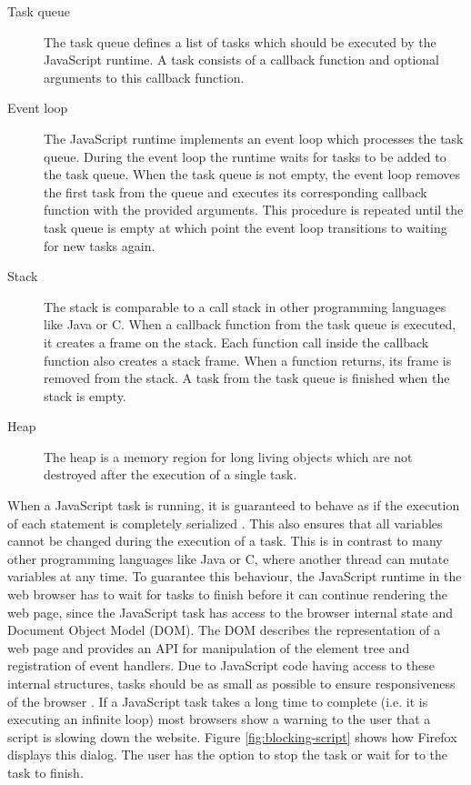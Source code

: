 \documentclass[
	ruledheaders=section,%
	class=report,%
	thesis={type=bachelor},%
	accentcolor=9c,%
	custommargins=true,%
	marginpar=false,%
	parskip=half-,%
	fontsize=11pt,%
]{tudapub}
\begin{document}
  \begin{description}
  \item[Task queue] The task queue defines a list of tasks which should be executed by the JavaScript runtime. A task consists of a callback function and optional arguments to this callback function.
  \item[Event loop] The JavaScript runtime implements an event loop which processes the task queue. During the event loop the runtime waits for tasks to be added to the task queue. When the task queue is not empty, the event loop removes the first task from the queue and executes its corresponding callback function with the provided arguments. This procedure is repeated until the task queue is empty at which point the event loop transitions to waiting for new tasks again.
  \item[Stack] The stack is comparable to a call stack in other programming languages like Java or C. When a callback function from the task queue is executed, it creates a frame on the stack. Each function call inside the callback function also creates a stack frame. When a function returns, its frame is removed from the stack. A task from the task queue is finished when the stack is empty.
  \item[Heap] The heap is a memory region for long living objects which are not destroyed after the execution of a single task.
  \end{description}

  When a JavaScript task is running, it is guaranteed to behave as if the execution of each statement is completely serialized \cite{html5-specification}. This also ensures that all variables cannot be changed during the execution of a task. This is in contrast to many other programming languages like Java or C, where another thread can mutate variables at any time. To guarantee this behaviour, the JavaScript runtime in the web browser has to wait for tasks to finish before it can continue rendering the web page, since the JavaScript task has access to the browser internal state and Document Object Model (DOM). The DOM describes the representation of a web page and provides an API for manipulation of the element tree and registration of event handlers. Due to JavaScript code having access to these internal structures, tasks should be as small as possible to ensure responsiveness of the browser \cite{chrome-rail-model}. If a JavaScript task takes a long time to complete (i.e. it is executing an infinite loop) most browsers show a warning to the user that a script is slowing down the website. Figure \ref{fig:blocking-script} shows how Firefox displays this dialog. The user has the option to stop the task or wait for to the task to finish.
\end{document}

